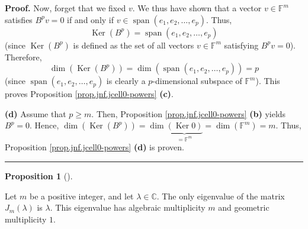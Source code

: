 \documentclass[numbers=enddot,12pt,final,onecolumn,notitlepage]{scrartcl}%
\numberwithin{exer}{subsection}
\theoremstyle{definition}
\newtheorem{prop}[theo]{Proposition}
\newenvironment{proposition}[1][]
{\begin{prop}[#1]\begin{leftbar}}
{\end{leftbar}\end{prop}}
\newenvironment{proof}[1][Proof]{\noindent\textbf{#1.} }{\ \rule{0.5em}{0.5em}}
\begin{document}
\begin{proof}
Now, forget that we fixed $v$. We thus have shown that a vector $v\in
\mathbb{F}^{m}$ satisfies $B^{p}v=0$ if and only if $v\in\operatorname*{span}%
\left(  e_{1},e_{2},\ldots,e_{p}\right)  $. Thus,
\[
\operatorname*{Ker}\left(  B^{p}\right)  =\operatorname*{span}\left(
e_{1},e_{2},\ldots,e_{p}\right)
\]
(since $\operatorname*{Ker}\left(  B^{p}\right)  $ is defined as the set of
all vectors $v\in\mathbb{F}^{m}$ satisfying $B^{p}v=0$). Therefore,%
\[
\dim\left(  \operatorname*{Ker}\left(  B^{p}\right)  \right)  =\dim\left(
\operatorname*{span}\left(  e_{1},e_{2},\ldots,e_{p}\right)  \right)  =p
\]
(since $\operatorname*{span}\left(  e_{1},e_{2},\ldots,e_{p}\right)  $ is
clearly a $p$-dimensional subspace of $\mathbb{F}^{m}$). This proves
Proposition \ref{prop.jnf.jcell0-powers} \textbf{(c)}. \medskip

\textbf{(d)} Assume that $p\geq m$. Then, Proposition
\ref{prop.jnf.jcell0-powers} \textbf{(b)} yields $B^{p}=0$. Hence,
$\dim\left(  \operatorname*{Ker}\left(  B^{p}\right)  \right)  =\dim
\underbrace{\left(  \operatorname*{Ker}0\right)  }_{=\mathbb{F}^{m}}%
=\dim\left(  \mathbb{F}^{m}\right)  =m$. Thus, Proposition
\ref{prop.jnf.jcell0-powers} \textbf{(d)} is proven.
\end{proof}

\begin{proposition}
\label{prop.jnf.jcell.multiplicity}Let $m$ be a positive integer, and let
$\lambda\in\mathbb{C}$. The only eigenvalue of the matrix $J_{m}\left(
\lambda\right)  $ is $\lambda$. This eigenvalue has algebraic multiplicity $m$
and geometric multiplicity $1$.
\end{proposition}
\end{document}
